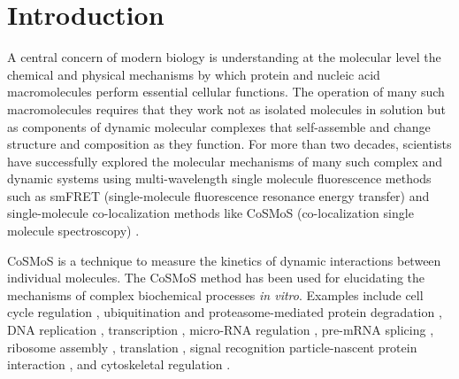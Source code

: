 \section*{Introduction}

A central concern of modern biology is understanding at the molecular level the chemical and physical mechanisms by which protein and nucleic acid macromolecules  perform essential cellular functions.  The operation of many such macromolecules requires that they work not as isolated molecules in solution but as components of dynamic molecular complexes that self-assemble and change structure and composition as they function.  For more than  two decades, scientists have successfully explored the molecular mechanisms of many such complex and dynamic systems using multi-wavelength single molecule fluorescence methods such as smFRET (single-molecule fluorescence resonance energy transfer) \cite{Roy2008-fo} and single-molecule co-localization methods like CoSMoS (co-localization single molecule spectroscopy) \cite{Larson2014-os, Van_Oijen2011-ig}.

CoSMoS is a technique to measure the kinetics of dynamic interactions between individual molecules.  The CoSMoS method has been used for elucidating the mechanisms of complex biochemical processes \textit{in vitro}. Examples include cell cycle regulation \cite{Lu2015-eu}, ubiquitination and proteasome-mediated protein degradation \cite{Lu2015-jq}, DNA replication \cite{Geertsema2014-bt,Ticau2015-ib}, transcription \cite{Zhang2012-no,Friedman2012-if,Friedman2013-sf}, micro-RNA regulation \cite{Salomon2015-kq}, pre-mRNA splicing \cite{Shcherbakova2013-bi, Krishnan2013-fy, Warnasooriya2014-ls}, ribosome assembly \cite{Kim2014-zc}, translation \cite{Wang2015-tt,Tsai2014-mi,OLeary2013-wo}, signal recognition particle-nascent protein interaction \cite{Noriega2014-vj}, and cytoskeletal regulation \cite{Smith2013-qj,Breitsprecher2012-mj}. 


